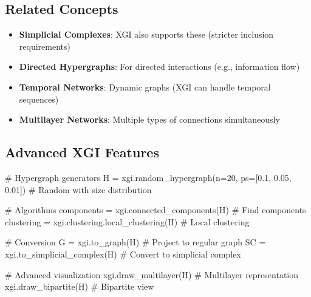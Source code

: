 \documentclass[
  11pt,
  letterpaper,
  oneside,
  openany]{book}
\newenvironment{Shaded}{\begin{snugshade}}{\end{snugshade}}
\newcommand{\CommentTok}[1]{\textcolor[rgb]{0.37,0.37,0.37}{#1}}
\newcommand{\DecValTok}[1]{\textcolor[rgb]{0.68,0.00,0.00}{#1}}
\newcommand{\FloatTok}[1]{\textcolor[rgb]{0.68,0.00,0.00}{#1}}
\newcommand{\NormalTok}[1]{\textcolor[rgb]{0.00,0.23,0.31}{#1}}
\newcommand{\OperatorTok}[1]{\textcolor[rgb]{0.37,0.37,0.37}{#1}}
\providecommand{\tightlist}{%
  \setlength{\itemsep}{0pt}\setlength{\parskip}{0pt}}
\begin{document}
\subsection{Related Concepts}\label{related-concepts}

\begin{itemize}
\tightlist
\item
  \textbf{Simplicial Complexes}: XGI also supports these (stricter
  inclusion requirements)
\item
  \textbf{Directed Hypergraphs}: For directed interactions (e.g.,
  information flow)
\item
  \textbf{Temporal Networks}: Dynamic graphs (XGI can handle temporal
  sequences)
\item
  \textbf{Multilayer Networks}: Multiple types of connections
  simultaneously
\end{itemize}

\subsection{Advanced XGI Features}\label{advanced-xgi-features}

\begin{Shaded}
\begin{Highlighting}[]
\CommentTok{\# Hypergraph generators}
\NormalTok{H }\OperatorTok{=}\NormalTok{ xgi.random\_hypergraph(n}\OperatorTok{=}\DecValTok{20}\NormalTok{, ps}\OperatorTok{=}\NormalTok{[}\FloatTok{0.1}\NormalTok{, }\FloatTok{0.05}\NormalTok{, }\FloatTok{0.01}\NormalTok{])  }\CommentTok{\# Random with size distribution}

\CommentTok{\# Algorithms}
\NormalTok{components }\OperatorTok{=}\NormalTok{ xgi.connected\_components(H)  }\CommentTok{\# Find components}
\NormalTok{clustering }\OperatorTok{=}\NormalTok{ xgi.clustering.local\_clustering(H)  }\CommentTok{\# Local clustering}

\CommentTok{\# Conversion}
\NormalTok{G }\OperatorTok{=}\NormalTok{ xgi.to\_graph(H)  }\CommentTok{\# Project to regular graph}
\NormalTok{SC }\OperatorTok{=}\NormalTok{ xgi.to\_simplicial\_complex(H)  }\CommentTok{\# Convert to simplicial complex}

\CommentTok{\# Advanced visualization}
\NormalTok{xgi.draw\_multilayer(H)  }\CommentTok{\# Multilayer representation}
\NormalTok{xgi.draw\_bipartite(H)  }\CommentTok{\# Bipartite view}
\end{Highlighting}
\end{Shaded}
\end{document}
